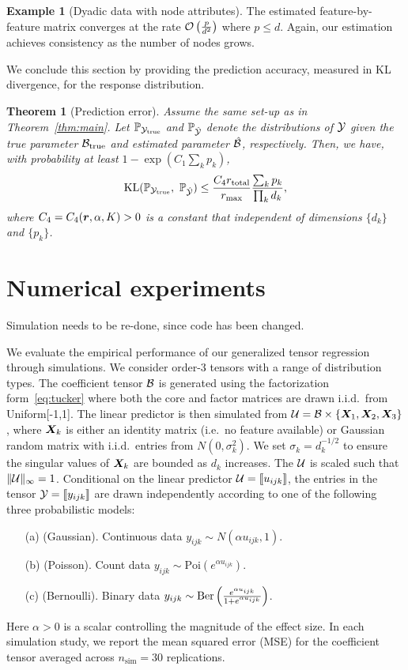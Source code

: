 \documentclass[12pt]{article}
\theoremstyle{plain}
\newtheorem{thm}{Theorem}[section]
\theoremstyle{definition}
\newtheorem{example}{Example}
\begin{document}
\begin{example} [Dyadic data with node attributes] The estimated feature-by-feature matrix converges at the rate $\mathcal{O}\left({p\over d^2}\right)$ where $p\leq d$. Again, our estimation achieves consistency as the number of nodes grows. 
\end{example}

We conclude this section by providing the prediction accuracy, measured in KL divergence, for the response distribution.   

\begin{thm}[Prediction error]\label{thm:KL}
Assume the same set-up as in Theorem~\ref{thm:main}. Let $\mathbb{P}_{\mathcal{Y}_{\text{true}}}$ and $\mathbb{P}_{\hat {\mathcal{Y}}}$ denote the distributions of $\mathcal{Y}$ given the true parameter $\mathcal{B}_{\text{true}}$ and estimated parameter $\hat {\mathcal{B}}$, respectively. Then, we have, with probability at least $1-\exp(C_1\sum_k p_k)$,
\[
\text{KL}(\mathbb{P}_{\tY_{\text{true}}},\ \mathbb{P}_{\hat \tY})\leq \frac{ C_{4}r_{\textup{total}}}{r_{\max}} {\sum_k p_k\over \prod_k d_k},
\]
where $C_4=C_4(\bm{r},\alpha, K)>0$ is a constant that independent of dimensions $\{d_k\}$ and $\{p_k\}$.
\end{thm}

\section{Numerical experiments}\label{sec:simulation}
{\color{red} Simulation needs to be re-done, since code has been changed. }

We evaluate the empirical performance of our generalized tensor regression through simulations. We consider order-3 tensors with a range of distribution types. The coefficient tensor $\mathcal{B}$ is generated using the factorization form~\eqref{eq:tucker} where both the core and factor matrices are drawn i.i.d.\ from Uniform[-1,1]. The linear predictor is then simulated from $\mathcal{U}=\mathcal{B}\times\{\bm X_1,\bm X_2,\bm X_3\}$, where $\bm X_k$ is either an identity matrix (i.e.\ no feature available) or Gaussian random matrix with i.i.d.\ entries from $N(0,\sigma_k^2)$. We set $\sigma_k=d_k^{-1/2}$ to ensure the singular values of $\bm X_k$ are bounded as $d_k$ increases. The $\mathcal{U}$ is scaled such that $\lVert\mathcal{U}\rVert_\infty=1$. Conditional on the linear predictor $\mathcal{U}=\llbracket u_{ijk} \rrbracket$, the entries in the tensor $\mathcal{Y}=\llbracket y_{ijk} \rrbracket$ are drawn independently according to one of the following three probabilistic models:

\begin{enumerate}
\item[(a)] (Gaussian). Continuous data $y_{ijk}\sim N\left(\alpha u_{ijk}, 1\right)$.
\item[(b)] (Poisson). Count data $y_{ijk}\sim\text{Poi}\left( e^{\alpha u_{ijk}}\right)$.
\item[(c)] (Bernoulli). Binary data $y_{ijk}\sim \text{Ber}\left( {e^{\alpha u_{ijk}} \over 1+e^{\alpha u_{ijk}}}\right)$.
\end{enumerate}
Here $\alpha>0$ is a scalar controlling the magnitude of the effect size. In each simulation study, we report the mean squared error (MSE) for the coefficient tensor averaged across $n_{\text{sim}}=30$ replications. 
\end{document}
